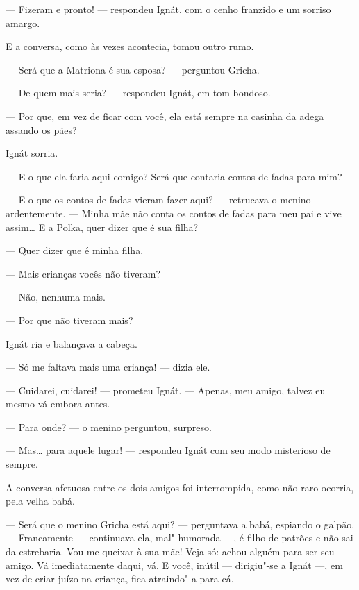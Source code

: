 --- Fizeram e pronto! --- respondeu Ignát, com o cenho franzido e um
sorriso amargo.

E a conversa, como às vezes acontecia, tomou outro rumo.

--- Será que a Matriona é sua esposa? --- perguntou Gricha.

--- De quem mais seria? --- respondeu Ignát, em tom bondoso.

--- Por que, em vez de ficar com você, ela está sempre na casinha da
adega assando os pães?

Ignát sorria.

--- E o que ela faria aqui comigo? Será que contaria contos de fadas
para mim?

--- E o que os contos de fadas vieram fazer aqui? --- retrucava o menino
ardentemente. --- Minha mãe não conta os contos de fadas para meu pai e
vive assim\ldots{} E a Polka, quer dizer que é sua filha?

--- Quer dizer que é minha filha.

--- Mais crianças vocês não tiveram?

--- Não, nenhuma mais.

--- Por que não tiveram mais?

Ignát ria e balançava a cabeça.

--- Só me faltava mais uma criança! --- dizia ele.


--- Cuidarei, cuidarei! --- prometeu Ignát. --- Apenas, meu amigo,
talvez eu mesmo vá embora antes.

--- Para onde? --- o menino perguntou, surpreso.

--- Mas\ldots{} para aquele lugar! --- respondeu Ignát com seu modo
misterioso de sempre.

A conversa afetuosa entre os dois amigos foi interrompida, como não raro
ocorria, pela velha babá.

--- Será que o menino Gricha está aqui? --- perguntava a babá, espiando o
galpão. --- Francamente --- continuava ela, mal"-humorada ---, é filho de
patrões e não sai da estrebaria. Vou me queixar à sua mãe! Veja só:
achou alguém para ser seu amigo. Vá imediatamente daqui, vá. E você,
inútil --- dirigiu"-se a Ignát ---, em vez de criar juízo na criança,
fica atraindo"-a para cá.

